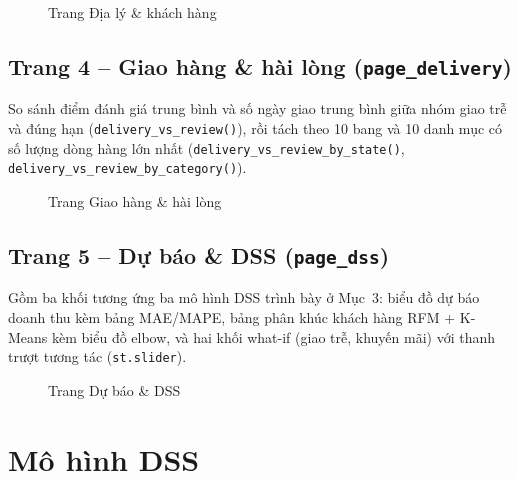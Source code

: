\documentclass[12pt,a4paper]{article}
\newcommand{\code}[1]{\texttt{\small #1}}
\begin{document}
\begin{figure}[h]
\centering
{}
\caption{Trang Địa lý \& khách hàng}\label{fig:ss-geo}
\end{figure}

\subsection{Trang 4 -- Giao hàng \& hài lòng (\code{page\_delivery})}
So sánh điểm đánh giá trung bình và số ngày giao trung bình giữa nhóm giao trễ và đúng hạn
(\code{delivery\_vs\_review()}), rồi tách theo 10 bang và 10 danh mục có số lượng dòng hàng lớn nhất
(\code{delivery\_vs\_review\_by\_state()}, \code{delivery\_vs\_review\_by\_category()}).

\begin{figure}[h]
\centering
{}
\caption{Trang Giao hàng \& hài lòng}\label{fig:ss-delivery}
\end{figure}

\subsection{Trang 5 -- Dự báo \& DSS (\code{page\_dss})}
Gồm ba khối tương ứng ba mô hình DSS trình bày ở Mục~3: biểu đồ dự báo doanh thu kèm bảng MAE/MAPE, bảng
phân khúc khách hàng RFM + K-Means kèm biểu đồ elbow, và hai khối what-if (giao trễ, khuyến mãi) với thanh
trượt tương tác (\code{st.slider}).

\begin{figure}[h]
\centering
{}
\caption{Trang Dự báo \& DSS}\label{fig:ss-dss}
\end{figure}

\section{Mô hình DSS}
\end{document}
